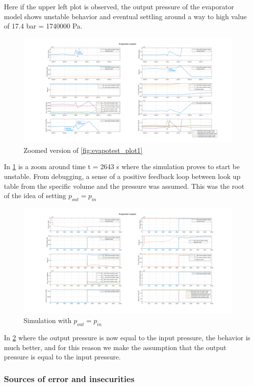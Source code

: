 Here if the upper left plot is observed, the output pressure of the evaporator model shows unstable behavior and eventual settling around a way to high value of 17.4 bar = 1740000 Pa.

\begin{figure}[h]
	\centering
	\includegraphics[width=2.1\textwidth]{Tests/Evapo_test1/plot_unstable_zoomed.png}
	\caption{Zoomed version of \cref{fig:evapotest_plot1}}
	\label{fig:evapotest_plot2}
\end{figure}
In \cref{fig:evapotest_plot2} is a zoom around time t = 2643 s where the simulation proves to start be unstable. From debugging, a sense of a positive feedback loop between look up table from the specific volume and the pressure was assumed. This was the root of the idea of setting $ p_{out} = p_{in} $ 

\begin{figure}[h]
	\centering
	\includegraphics[width=2.1\textwidth]{Tests/Evapo_test1/plot_stable.png}
	\caption{Simulation with $ p_{out} = p_{in} $}
	\label{fig:evapotest_plot3}
\end{figure}

In \cref{fig:evapotest_plot3} where the output pressure is now equal to the input pressure, the behavior is much better, and for this reason we make the assumption that the output pressure is equal to the input pressure.

\clearpage
\subsubsection{Sources of error and insecurities}
